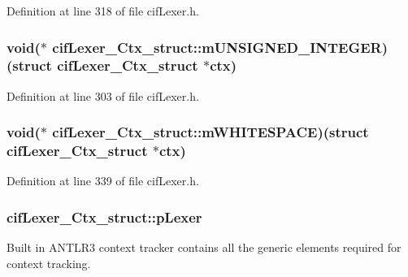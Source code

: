 Definition at line 318 of file cif\-Lexer.\-h.

\hypertarget{structcif_lexer___ctx__struct_a07ef255493efdb864fee1cc988928de5}{
\subsubsection[{m\-U\-N\-S\-I\-G\-N\-E\-D\-\_\-\-I\-N\-T\-E\-G\-E\-R}]{\setlength{\rightskip}{0pt plus 5cm}void($\ast$ cif\-Lexer\-\_\-\-Ctx\-\_\-struct\-::m\-U\-N\-S\-I\-G\-N\-E\-D\-\_\-\-I\-N\-T\-E\-G\-E\-R)(struct {\bf cif\-Lexer\-\_\-\-Ctx\-\_\-struct} $\ast$ctx)}}\label{structcif_lexer___ctx__struct_a07ef255493efdb864fee1cc988928de5}


Definition at line 303 of file cif\-Lexer.\-h.

\hypertarget{structcif_lexer___ctx__struct_ad88575ebe99c434289ba6379fe71b5aa}{
\subsubsection[{m\-W\-H\-I\-T\-E\-S\-P\-A\-C\-E}]{\setlength{\rightskip}{0pt plus 5cm}void($\ast$ cif\-Lexer\-\_\-\-Ctx\-\_\-struct\-::m\-W\-H\-I\-T\-E\-S\-P\-A\-C\-E)(struct {\bf cif\-Lexer\-\_\-\-Ctx\-\_\-struct} $\ast$ctx)}}\label{structcif_lexer___ctx__struct_ad88575ebe99c434289ba6379fe71b5aa}


Definition at line 339 of file cif\-Lexer.\-h.

\hypertarget{structcif_lexer___ctx__struct_a91ef7436dbc739a84f7824b1ba8b55ee}{
\subsubsection[{p\-Lexer}]{ cif\-Lexer\-\_\-\-Ctx\-\_\-struct\-::p\-Lexer}}\label{structcif_lexer___ctx__struct_a91ef7436dbc739a84f7824b1ba8b55ee}
Built in A\-N\-T\-L\-R3 context tracker contains all the generic elements required for context tracking. 

